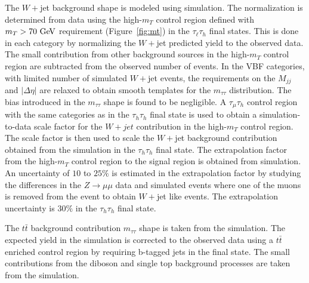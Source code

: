 The $W+$jet background shape is modeled using simulation. The normalization is determined from data using the high-$m_T$ control region defined with $m_{T}>70~\mathrm{Ge\kern -0.1em V}$ requirement (Figure~\ref{fig:mt}) in the $\tau_{\ell}\tau_h$ final states. This is done in each category by normalizing the $W+$jet predicted yield to the observed data. The small contribution from other background sources in the high-$m_T$ control region are subtracted from the observed number of events. In the VBF categories, with limited number of simulated $W+$jet events, the requirements on the $M_{jj}$ and $|\Delta \eta|$ are relaxed to obtain smooth templates for the $m_{\tau\tau}$ distribution. The bias introduced in the $m_{\tau\tau}$ shape is found to be negligible. A $\tau_{\mu}\tau_h$ control region with the same categories as in the $\tau_h\tau_h$ final state is used to obtain a simulation-to-data scale factor for the $W+jet$ contribution in the high-$m_T$ control region. The scale factor is then used to scale the $W+$jet background contribution obtained from the simulation in the $\tau_h\tau_h$ final state. The extrapolation factor from the high-$m_{T}$ control region to the signal region is obtained from simulation. An uncertainty of $10$ to $25\%$ is estimated in the extrapolation factor by studying the differences in the $Z\rightarrow \mu\mu$ data and simulated events where one of the muons is removed from the event to obtain $W+$jet like events. The extrapolation uncertainty is $30\%$ in the $\tau_h\tau_h$ final state.

The $t\bar{t}$ background contribution $m_{\tau\tau}$ shape is taken from the simulation. The expected yield in the simulation is corrected to the observed data using a $t\bar{t}$ enriched control region by requiring b-tagged jets in the final state. The small contributions from the diboson and single top background processes  are taken from the simulation. 

